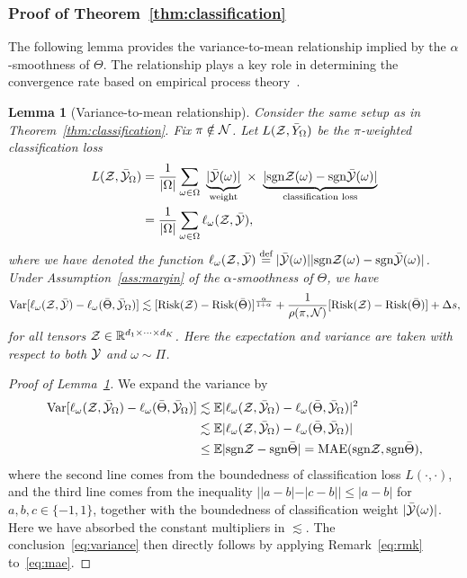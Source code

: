 \documentclass[11pt]{article}
\theoremstyle{plain}
\newtheorem{lem}{Lemma}
\theoremstyle{definition}
\newcommand*{\KeepStyleUnderBrace}[1]{%
  \mathop{%
    \mathchoice
    {\underbrace{\displaystyle#1}}%
    {\underbrace{\textstyle#1}}%
    {\underbrace{\scriptstyle#1}}%
    {\underbrace{\scriptscriptstyle#1}}%
  }\limits
}
\def\sign{\textup{sgn}}
\begin{document}
\subsubsection{Proof of Theorem~\ref{thm:classification}}
The following lemma provides the variance-to-mean relationship implied by the $\alpha$-smoothness of $\Theta$. The relationship plays a key role in determining the convergence rate based on empirical process theory~\citep{shen1994convergence}. 
\begin{lem}[Variance-to-mean relationship]\label{lem:variance}
Consider the same setup as in Theorem~\ref{thm:classification}. Fix $\pi\notin \mathcal{N}$. Let $L(\mathcal{Z}, \bar Y_\Omega)$ be the $\pi$-weighted classification loss
\begin{align}\label{eq:sample2}
L(\tZ, \bar \tY_\Omega)&= {1\over |\Omega|}\sum_{\omega \in \Omega}\ \KeepStyleUnderBrace{|\bar \tY(\omega)|}_{\text{weight}}\  \times \ \KeepStyleUnderBrace{| \sign \tZ(\omega)-\sign \bar \tY(\omega)|}_{\text{classification loss}}\notag \\
&={1\over |\Omega|}\sum_{\omega \in \Omega}\ell_\omega(\tZ, \bar \tY),
\end{align}
where we have denoted the function $\ell_\omega(\tZ,\bar \tY)\stackrel{\text{def}}{=}|\bar \tY(\omega)||\sign\tZ(\omega)-\sign \bar \tY(\omega)|$. Under Assumption~\ref{ass:margin} of the $\alpha$-smoothness of $\Theta$, we have
\begin{equation}\label{eq:variance}
\textup{Var}[\ell_\omega(\mathcal{Z},\bar {\mathcal{Y}})-\ell_\omega(\bar \Theta, \bar {\mathcal{Y}}_\Omega)]\lesssim [\textup{Risk}(\mathcal{Z})-\textup{Risk}(\bar \Theta)]^{\alpha \over 1+\alpha}+{1\over \rho(\pi, \mathcal{N})}[\textup{Risk}(\mathcal{Z})-\textup{Risk}(\bar \Theta)]+\Delta s,
\end{equation}
for all tensors $\mathcal{Z}\in\mathbb{R}^{d_1\times \cdots \times d_K}$. Here the expectation and variance are taken with respect to both $\mathcal{Y}$ and $\omega\sim \Pi$. 
\end{lem}
\begin{proof}[Proof of Lemma~\ref{lem:variance}]
We expand the variance by
\begin{align}\label{eq:mae}
\text{Var}[\ell_\omega(\tZ,\bar \tY_\Omega)-\ell_\omega(\bar \Theta, \bar \tY_\Omega)] &\lesssim \mathbb{E}|\ell_\omega(\tZ,\bar \tY_\Omega)-\ell_\omega(\bar \Theta, \bar \tY_\Omega)|^2\notag \\
&\lesssim \mathbb{E}|\ell_\omega(\tZ,\bar \tY_\Omega)-\ell_\omega(\bar \Theta, \bar \tY_\Omega)|\notag \\
&\leq \mathbb{E}|\sign\tZ-\sign \bar \Theta| = \textup{MAE}(\sign\tZ, \sign \bar \Theta),
\end{align}
where the second line comes from the boundedness of classification loss $L(\cdot ,\cdot)$, and the third line comes from the inequality $||a-b|-|c-b||\leq |a-b|$ for $a,b,c\in\{-1,1\}$, together with the boundedness of classification weight $|\bar{\mathcal{Y}}(\omega)|$. Here we have absorbed the constant multipliers in $\lesssim$. The conclusion~\eqref{eq:variance} then directly follows by applying Remark~\ref{eq:rmk} to~\eqref{eq:mae}.
\end{proof}
\end{document}
